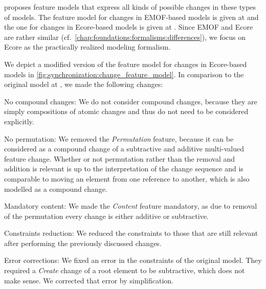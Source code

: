 \textcite{kramer2017a} proposes feature models that express all kinds of possible changes in these types of models.
The feature model for changes in \gls{EMOF}-based models is given at \cite[Fig. 5.2]{kramer2017a} and the one for changes in Ecore-based models is given at \cite[Fig. 5.3]{kramer2017a}.
Since \gls{EMOF} and Ecore are rather similar (cf.~\autoref{chap:foundations:formalisms:differences}), we focus on Ecore as the practically realized modeling formalism.

We depict a modified version of the feature model for changes in Ecore-based models in \autoref{fig:synchronization:change_feature_model}.
In comparison to the original model at \cite[Fig. 5.3]{kramer2017a}, we made the following changes:
\begin{properdescription}
    \item[No compound changes:] We do not consider compound changes, because they are simply compositions of atomic changes and thus do not need to be considered explicitly.
    \item[No permutation:] We removed the \emph{Permutation} feature, because it can be considered as a compound change of a subtractive and additive multi-valued feature change. Whether or not permutation rather than the removal and addition is relevant is up to the interpretation of the change sequence and is comparable to moving an element from one reference to another, which is also modelled as a compound change.
    \item[Mandatory content:] We made the \emph{Content} feature mandatory, as due to removal of the permutation every change is either additive or subtractive.
    \item[Constraints reduction:] We reduced the constraints to those that are still relevant after performing the previously discussed changes.
    \item[Error corrections:] We fixed an error in the constraints of the original model. They required a \emph{Create} change of a root element to be subtractive, which does not make sense. We corrected that error by simplification.
\end{properdescription}

